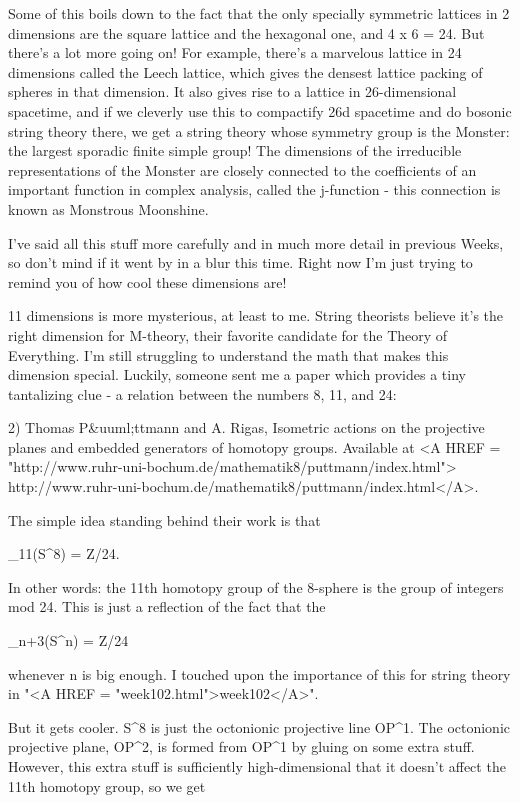 Some of this boils down to the fact that the only specially symmetric
lattices in 2 dimensions are the square lattice and the hexagonal one,
and 4 x 6 = 24.  But there's a lot more going on!  For example, there's
a marvelous lattice in 24 dimensions called the Leech lattice, which
gives the densest lattice packing of spheres in that dimension.  It also
gives rise to a lattice in 26-dimensional spacetime, and if we cleverly
use this to compactify 26d spacetime and do bosonic string theory there,
we get a string theory whose symmetry group is the Monster: the largest
sporadic finite simple group!  The dimensions of the irreducible
representations of the Monster are closely connected to the coefficients
of an important function in complex analysis, called the j-function -
this connection is known as Monstrous Moonshine.

I've said all this stuff more carefully and in much more detail in
previous Weeks, so don't mind if it went by in a blur this time.  Right
now I'm just trying to remind you of how cool these dimensions are!

11 dimensions is more mysterious, at least to me.  String theorists
believe it's the right dimension for M-theory, their favorite candidate
for the Theory of Everything.  I'm still struggling to understand the
math that makes this dimension special.  Luckily, someone sent me a
paper which provides a tiny tantalizing clue - a relation between the
numbers 8, 11, and 24:  

2) Thomas P&uuml;ttmann and A. Rigas, Isometric actions on the projective
planes and embedded generators of homotopy groups.  Available at
<A HREF = 
"http://www.ruhr-uni-bochum.de/mathematik8/puttmann/index.html">
http://www.ruhr-uni-bochum.de/mathematik8/puttmann/index.html</A>.

The simple idea standing behind their work is that

\pi _{11}(S^{8}) = Z/24.

In other words: the 11th homotopy group of the 8-sphere is the group
of integers mod 24.  This is just a reflection of the fact that the

\pi _{n+3}(S^{n}) = Z/24

whenever n is big enough.  I touched upon the importance of this
for string theory in "<A HREF = "week102.html">week102</A>".  

But it gets cooler.  S^{8} is just the octonionic projective
line OP^{1}.  The octonionic projective plane, OP^{2},
is formed from OP^{1} by gluing on some extra stuff.  However,
this extra stuff is sufficiently high-dimensional that it doesn't affect
the 11th homotopy group, so we get

